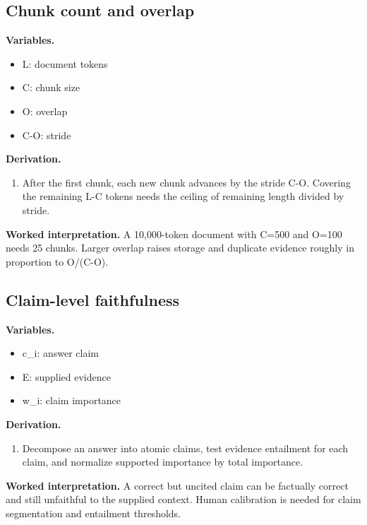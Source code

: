 \subsection{Chunk count and overlap}
\textbf{Variables.}\begin{itemize}
\item L: document tokens
\item C: chunk size
\item O: overlap
\item C-O: stride
\end{itemize}
\textbf{Derivation.}\begin{derivation}\begin{enumerate}
\item After the first chunk, each new chunk advances by the stride C-O. Covering the remaining L-C tokens needs the ceiling of remaining length divided by stride.
\end{enumerate}\end{derivation}
\textbf{Worked interpretation.} A 10,000-token document with C=500 and O=100 needs 25 chunks. Larger overlap raises storage and duplicate evidence roughly in proportion to O/(C-O).
\subsection{Claim-level faithfulness}
\textbf{Variables.}\begin{itemize}
\item c\_i: answer claim
\item E: supplied evidence
\item w\_i: claim importance
\end{itemize}
\textbf{Derivation.}\begin{derivation}\begin{enumerate}
\item Decompose an answer into atomic claims, test evidence entailment for each claim, and normalize supported importance by total importance.
\end{enumerate}\end{derivation}
\textbf{Worked interpretation.} A correct but uncited claim can be factually correct and still unfaithful to the supplied context. Human calibration is needed for claim segmentation and entailment thresholds.
